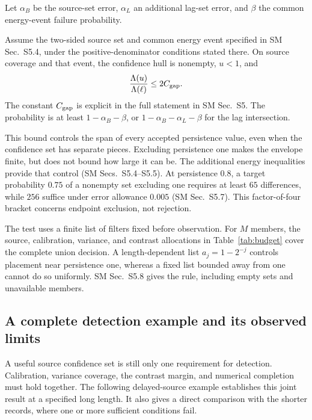 Let $\alpha_B$ be the source-set error, $\alpha_L$ an additional lag-set error, and $\beta$ the common energy-event failure probability.
\begin{theorem}\label{src16:envelope-thm}
Assume the two-sided source set and common energy event specified in SM Sec.~S5.4, under the positive-denominator conditions stated there. On source coverage and that event, the confidence hull is nonempty, $u<1$, and
\begin{equation}\label{src16:span}
 \frac{\Lambda(u)}{\Lambda(\ell)}\le2C_{\rm gap}.
\end{equation}
The constant $C_{\rm gap}$ is explicit in the full statement in SM Sec.~S5. The probability is at least $1-\alpha_B-\beta$, or $1-\alpha_B-\alpha_L-\beta$ for the lag intersection.
\end{theorem}
This bound controls the span of every accepted persistence value, even when the confidence set has separate pieces. Excluding persistence one makes the envelope finite, but does not bound how large it can be. The additional energy inequalities provide that control (SM Secs.~S5.4--S5.5). At persistence $0.8$, a target probability $0.75$ of a nonempty set excluding one requires at least $65$ differences, while $256$ suffice under error allowance $0.005$ (SM Sec.~S5.7). This factor-of-four bracket concerns endpoint exclusion, not rejection.

The test uses a finite list of filters fixed before observation. For $M$ members, the source, calibration, variance, and contrast allocations in Table~\ref{tab:budget} cover the complete union decision. A length-dependent list $a_j=1-2^{-j}$ controls placement near persistence one, whereas a fixed list bounded away from one cannot do so uniformly. SM Sec.~S5.8 gives the rule, including empty sets and unavailable members.

\subsection{A complete detection example and its observed limits}
A useful source confidence set is still only one requirement for detection. Calibration, variance coverage, the contrast margin, and numerical completion must hold together. The following delayed-source example establishes this joint result at a specified long length. It also gives a direct comparison with the shorter records, where one or more sufficient conditions fail.

